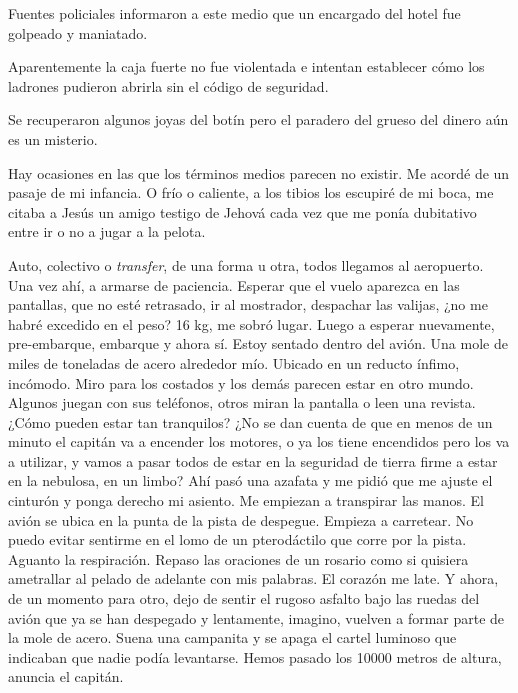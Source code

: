 \documentclass[12pt,twoside,openright,a5paper]{book}
\begin{document}
Fuentes policiales informaron a este medio que un encargado del hotel fue
golpeado y maniatado.

Aparentemente la caja fuerte no fue violentada e intentan establecer cómo
los ladrones pudieron abrirla sin el código de seguridad.

Se recuperaron algunos joyas del botín pero el paradero del grueso del
dinero aún es un misterio.

\vspace{0.5cm}

\hrulefill\hspace{0.2cm} \decofourleft\decofourright \hspace{0.2cm} \hrulefill
\vspace{0.5cm}

Hay ocasiones en las que los términos medios parecen no existir.
Me acordé de un pasaje de mi infancia.
O frío o caliente, a los tibios los escupiré de mi boca, me citaba a Jesús un
amigo testigo de Jehová cada vez que me ponía dubitativo entre ir o no
a jugar a la pelota.


\vspace{0.5cm}
\afterpage{}
\hrulefill\hspace{0.2cm} \decofourleft\decofourright \hspace{0.2cm} \hrulefill
\vspace{0.5cm}

Auto, colectivo o \emph{transfer}, de una forma u otra, todos llegamos al
aeropuerto. Una vez ahí, a armarse de paciencia. Esperar que el vuelo
aparezca en las pantallas, que no esté retrasado, ir al mostrador,
despachar las valijas, ¿no me habré excedido en el peso? 16 kg, me sobró
lugar. Luego a esperar nuevamente, pre-embarque, embarque y ahora sí. Estoy
sentado dentro del avión. Una mole de miles de toneladas de acero alrededor
mío. Ubicado en un reducto ínfimo, incómodo. Miro para los costados y
los demás parecen estar en otro mundo. Algunos juegan con sus teléfonos,
otros miran la pantalla o leen una revista. ¿Cómo pueden estar tan
tranquilos? ¿No se dan cuenta de que en menos de un minuto el capitán va
a encender los motores, o ya los tiene encendidos pero los va a utilizar, y
vamos a pasar todos de estar en la seguridad de tierra firme a estar en la
nebulosa, en un limbo? Ahí pasó una azafata y me pidió que me ajuste el
cinturón y ponga derecho mi asiento. Me empiezan a transpirar las manos. El
avión se ubica en la punta de la pista de despegue. Empieza a carretear. No
puedo evitar sentirme en el lomo de un pterodáctilo que corre por la
pista. Aguanto la respiración. Repaso las oraciones de un rosario como si
quisiera ametrallar al pelado de adelante con mis palabras. El corazón me
late. Y ahora, de un momento para otro, dejo de sentir el rugoso asfalto
bajo las ruedas del avión que ya se han despegado y lentamente, imagino,
vuelven a formar parte de la mole de acero. Suena una campanita y se apaga
el cartel luminoso que indicaban que nadie podía levantarse. Hemos pasado
los 10000 metros de altura, anuncia el capitán.
\end{document}
